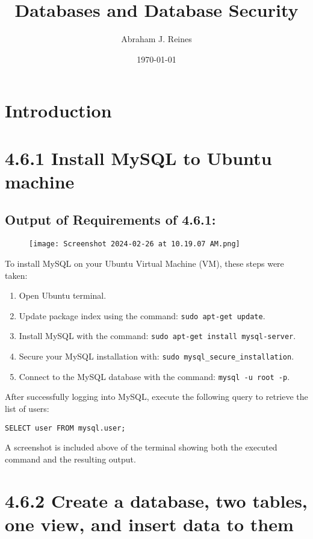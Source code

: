 \documentclass{article}
\title{Databases and Database Security}
\author{Abraham J. Reines}
\date{\today}
\begin{document}
\maketitle

\section*{Introduction}

\section*{4.6.1 Install MySQL to Ubuntu machine}

\subsection*{Output of Requirements of 4.6.1:}
\begin{figure}[H]
    \centering
    \texttt{[image: Screenshot 2024-02-26 at 10.19.07 AM.png]}
    \caption{}
\end{figure}


To install MySQL on your Ubuntu Virtual Machine (VM), these steps were taken:

\begin{enumerate}
    \item Open Ubuntu terminal.
    \item Update package index using the command: \texttt{sudo apt-get update}.
    \item Install MySQL with the command: \texttt{sudo apt-get install mysql-server}.
    \item Secure your MySQL installation with: \texttt{sudo mysql\_secure\_installation}.
    \item Connect to the MySQL database with the command: \texttt{mysql -u root -p}.
\end{enumerate}

After successfully logging into MySQL, execute the following query to retrieve the list of users:

\begin{verbatim}
SELECT user FROM mysql.user;
\end{verbatim}

A screenshot is included above of the terminal showing both the executed command and the resulting output. 

\section*{4.6.2 Create a database, two tables, one view, and insert data to them}
\end{document}
